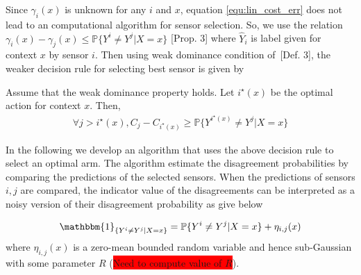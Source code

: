 Since $\gamma_i(x)$ is unknown for any $i$ and $x$, equation \eqref{equ:lin_cost_err} does not lead to an computational algorithm for sensor selection. So, we use the relation $\gamma_i(x)-\gamma_j(x)\leq\mathbb{P}\{Y^i\neq Y^j| X=x\}$ \cite{hanawal2017unsupervised}[Prop. 3] where $\widehat{Y}_i$ is label given for context $x$ by sensor $i$. Then using weak dominance condition of~\cite{hanawal2017unsupervised}[Def. 3], the weaker decision rule for selecting best sensor is given by

\begin{prop}
Assume that the weak dominance property holds. Let $i^\star(x)$ be the optimal action for context $x$.	Then,
\begin{align}
\label{equ:selection_label}
\forall j > i^\star (x),	C_j - C_{i^\star(x)} \ge \mathbb{P}\{Y^{i^\star(x)}\neq Y^j| X=x\}
\end{align}
\end{prop}
In the following we develop an algorithm that uses the above decision rule to select an optimal arm. The algorithm estimate the disagreement probabilities by comparing the predictions of the selected sensors. When the predictions of sensors $i,j$ are compared, the indicator value of the disagreements can be interpreted as a noisy version of their disagreement probability as give below

\[\mathbbm{1}_{\{Y^i \neq Y^j|X=x\}} = \mathbb{P}\{Y^i\neq Y^j|X=x\}+ \eta_{i,j}(x)\]
where $\eta_{i,j}(x)$ is a zero-mean bounded random variable and hence sub-Gaussian with some parameter $R$ (\colorbox{red}{Need to compute value of $R$}).
